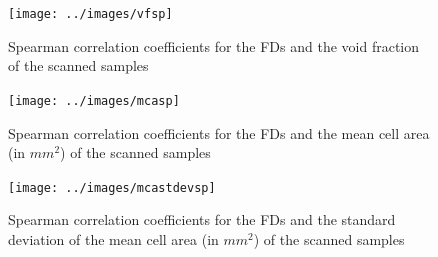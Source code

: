 



\begin{figure}[htb]
\centering
\texttt{[image: ../images/vfsp]}
\caption{Spearman correlation coefficients for the FDs and the void fraction of the scanned samples}
\label{fig:corrVF}
\end{figure}

\begin{figure}[htb]
\centering
\texttt{[image: ../images/mcasp]}
\caption{Spearman correlation coefficients for the FDs and the mean cell area (in $mm^{2}$) of the scanned samples}
\label{fig:corrMCA}
\end{figure}

\begin{figure}[htb]
\centering
\texttt{[image: ../images/mcastdevsp]}
\caption{Spearman correlation coefficients for the FDs and the standard deviation of the mean cell area (in $mm^{2}$) of the scanned samples}
\label{fig:corrMCAstdev}
\end{figure}



